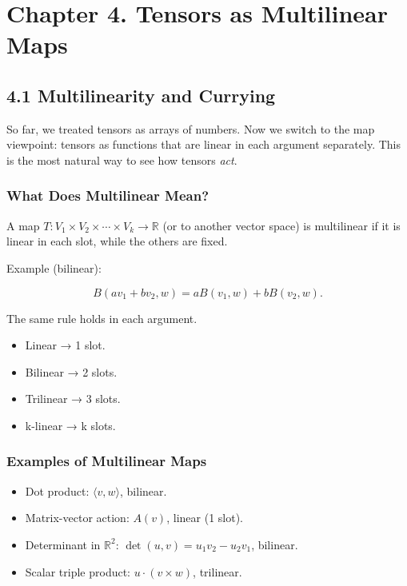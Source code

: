\documentclass[
  letterpaper,
  DIV=11,
  numbers=noendperiod]{scrreprt}
\providecommand{\tightlist}{%
  \setlength{\itemsep}{0pt}\setlength{\parskip}{0pt}}
\begin{document}
\section{Chapter 4. Tensors as Multilinear
Maps}\label{chapter-4.-tensors-as-multilinear-maps}

\subsection{4.1 Multilinearity and
Currying}\label{multilinearity-and-currying}

So far, we treated tensors as arrays of numbers. Now we switch to the
map viewpoint: tensors as functions that are linear in each argument
separately. This is the most natural way to see how tensors \emph{act}.

\subsubsection{What Does Multilinear
Mean?}\label{what-does-multilinear-mean}

A map \(T: V_1 \times V_2 \times \cdots \times V_k \to \mathbb{R}\) (or
to another vector space) is multilinear if it is linear in each slot,
while the others are fixed.

Example (bilinear):

\[
B(av_1 + bv_2, w) = a B(v_1, w) + b B(v_2, w).
\]

The same rule holds in each argument.

\begin{itemize}
\tightlist
\item
  Linear → 1 slot.
\item
  Bilinear → 2 slots.
\item
  Trilinear → 3 slots.
\item
  k-linear → k slots.
\end{itemize}

\subsubsection{Examples of Multilinear
Maps}\label{examples-of-multilinear-maps}

\begin{itemize}
\tightlist
\item
  Dot product: \(\langle v,w\rangle\), bilinear.
\item
  Matrix-vector action: \(A(v)\), linear (1 slot).
\item
  Determinant in \(\mathbb{R}^2\): \(\det(u,v) = u_1 v_2 - u_2 v_1\),
  bilinear.
\item
  Scalar triple product: \(u \cdot (v \times w)\), trilinear.
\end{itemize}
\end{document}
